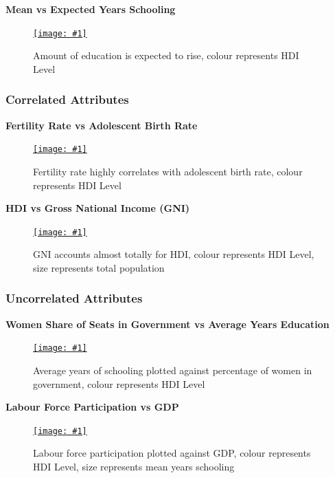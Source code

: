 \documentclass[11pt,a4paper,final]{article}
\newcommand\onlinefig[3]{
\begin{figure}[H]
  \centering
  \href{#3}{\texttt{[image: \#1]}}
  \caption{#2} 
  \label{fig:#1}
\end{figure}
}
\begin{document}
\begin{multicols}{2}
\begin{flushleft}
\textbf{Mean vs Expected Years Schooling}
\end{flushleft}
\vspace{-2cm}
\onlinefig{mean_vs_expected_years_schooling_scatterplot.png}{Amount of education is expected to rise, colour represents HDI Level}{https://public.tableau.com/views/CS3205-HDI/Sheet7?:language=en-GB&:display_count=n&:origin=viz_share_link}

\subsubsection{Correlated Attributes}
\begin{flushleft}
\textbf{Fertility Rate vs Adolescent Birth Rate}
\end{flushleft}
\onlinefig{fertility_vs_adolescent_birth_rate_scatterplot}{Fertility rate highly correlates with adolescent birth rate, colour represents HDI Level}{https://public.tableau.com/views/CS3205-HDI/Sheet10?:language=en-GB&:display_count=n&:origin=viz_share_link}

\begin{flushleft}
\textbf{HDI vs Gross National Income (GNI)}
\end{flushleft}
\onlinefig{gni_vs_hdi_scatterplot}{GNI accounts almost totally for HDI, colour represents HDI Level, size represents total population}{https://public.tableau.com/views/CS3205-HDI/Sheet5?:language=en-GB&:display_count=n&:origin=viz_share_link}

\subsubsection{Uncorrelated Attributes}
\textbf{Women Share of Seats in Government vs Average Years Education}
\onlinefig{percentage_women_in_government_vs_mean_years_education_scatterplot.png}{Average years of schooling plotted against percentage of women in government, colour represents HDI Level}{https://public.tableau.com/views/CS3205-HDI/Sheet12?:language=en-GB&:display_count=n&:origin=viz_share_link}

\begin{flushleft}
\textbf{Labour Force Participation vs GDP}
\end{flushleft}
\onlinefig{labour_force_participation_vs_gdp_scatterplot}{Labour force participation plotted against GDP, colour represents HDI Level, size represents mean years schooling}{https://public.tableau.com/views/CS3205-HDI/Sheet13?:language=en-GB&:display_count=n&:origin=viz_share_link}


\end{multicols}
\end{document}

